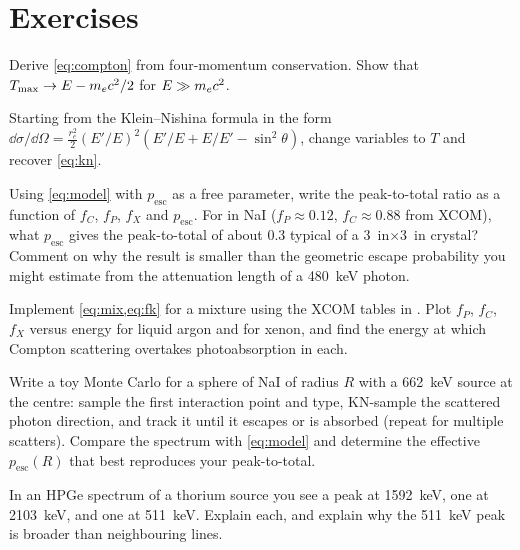 \section{Exercises}
\begin{exercise}[A]
Derive \cref{eq:compton} from four-momentum conservation. Show that $T_\text{max} \to E - m_e c^2/2$ for $E \gg m_e c^2$.
\end{exercise}
\begin{exercise}[A]
Starting from the Klein--Nishina formula in the form $\dd\sigma/\dd\Omega = \tfrac{r_e^2}{2}(E'/E)^2\left(E'/E + E/E' - \sin^2\theta\right)$, change variables to $T$ and recover \cref{eq:kn}.
\end{exercise}
\begin{exercise}[A]
Using \cref{eq:model} with $p_\text{esc}$ as a free parameter, write the peak-to-total ratio as a function of $f_C$, $f_P$, $f_X$ and $p_\text{esc}$. For  in NaI ($f_P \approx 0.12$, $f_C \approx 0.88$ from XCOM), what $p_\text{esc}$ gives the peak-to-total of about 0.3 typical of a \SI{3}{in}$\times$\SI{3}{in} crystal? Comment on why the result is smaller than the geometric escape probability you might estimate from the attenuation length of a \SI{480}{keV} photon.
\end{exercise}
\begin{exercise}[P]
Implement \cref{eq:mix,eq:fk} for a mixture using the XCOM tables in . Plot $f_P$, $f_C$, $f_X$ versus energy for liquid argon and for xenon, and find the energy at which Compton scattering overtakes photoabsorption in each.
\end{exercise}
\begin{exercise}[P]
Write a toy Monte Carlo for a sphere of NaI of radius $R$ with a \SI{662}{keV} source at the centre: sample the first interaction point and type, KN-sample the scattered photon direction, and track it until it escapes or is absorbed (repeat for multiple scatters). Compare the spectrum with \cref{eq:model} and determine the effective $p_\text{esc}(R)$ that best reproduces your peak-to-total.
\end{exercise}
\begin{exercise}[R]
In an HPGe spectrum of a thorium source you see a peak at \SI{1592}{keV}, one at \SI{2103}{keV}, and one at \SI{511}{keV}. Explain each, and explain why the \SI{511}{keV} peak is broader than neighbouring lines.
\end{exercise}

